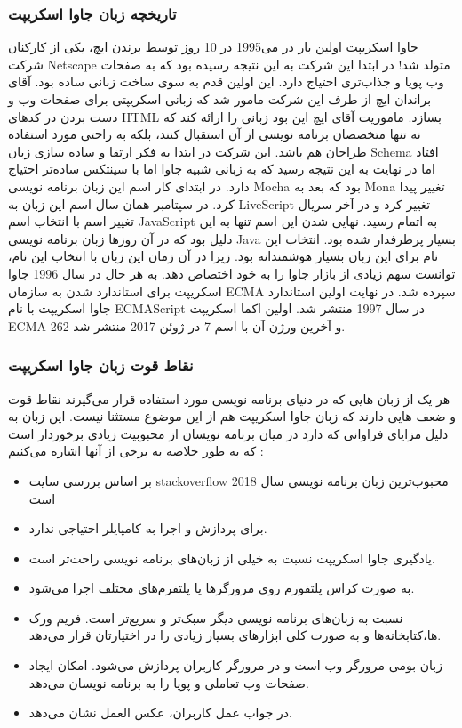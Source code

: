 \subsubsection{تاریخچه زبان جاوا اسکریپت}
جاوا اسکریپت اولین بار در می‌1995 در 10 روز توسط برندن ایچ، یکی از کارکنان شرکت Netscape متولد شد! در ابتدا این شرکت به این نتیجه رسیده بود که به صفحات وب پویا و جذاب‌تری احتیاج دارد. این اولین قدم به سوی ساخت زبانی ساده بود. آقای براندان ایچ از طرف این شرکت مامور شد که زبانی اسکریپتی برای صفحات وب و دست بردن در کدهای HTML بسازد. ماموریت آقای ایچ این بود زبانی را ارائه کند که نه تنها متخصصان برنامه نویسی از آن استقبال کنند، بلکه به راحتی مورد استفاده طراحان هم باشد.
این شرکت در ابتدا به فکر ارتقا و ساده سازی زبان Schema افتاد اما در نهایت به این نتیجه رسید که به زبانی شبیه جاوا اما با سینتکس ساده‌تر احتیاج دارد. در ابتدای کار اسم این زبان برنامه نویسی Mocha بود که بعد به Mona تغییر پیدا کرد. در سپتامبر همان سال اسم این زبان به LiveScript تغییر کرد و در آخر سریال تغییر اسم با انتخاب اسم JavaScript به اتمام  رسید.
نهایی شدن این اسم تنها به این دلیل بود که در آن روز‌ها زبان برنامه نویسی Java بسیار پرطرفدار شده بود. انتخاب این نام برای این زبان بسیار هوشمندانه بود. زیرا در آن زمان  این زبان با انتخاب این نام، توانست سهم زیادی از بازار جاوا را به خود اختصاص دهد. به هر حال در سال 1996 جاوا اسکریپت برای استاندارد شدن به سازمان ECMA سپرده شد. در نهایت اولین استاندارد جاوا اسکریپت با نام ECMAScript در سال 1997 منتشر شد. اولین اکما اسکریپت ECMA-262 و آخرین ورژن آن با اسم
7
در ژوئن 2017 منتشر شد.

\subsubsection{نقاط قوت زبان جاوا اسکریپت}
هر یک از زبان هایی که در دنیای برنامه نویسی مورد استفاده قرار می‌گیرند نقاط قوت و ضعف هایی دارند که زبان جاوا اسکریپت هم از این موضوع مستثنا نیست. این زبان به دلیل مزایای فراوانی که دارد در میان برنامه نویسان از محبوبیت زیادی برخوردار است که به طور خلاصه به برخی از آنها اشاره می‌کنیم :
\begin{itemize}
	\item
بر اساس بررسی سایت stackoverflow محبوب‌ترین زبان برنامه نویسی سال 2018 است
\item
برای پردازش و اجرا به کامپایلر احتیاجی ندارد.
\item
یادگیری جاوا اسکریپت نسبت به خیلی از زبان‌های برنامه نویسی راحت‌تر است.
\item
به صورت کراس پلتفورم روی مرورگر‌ها یا پلتفرم‌های مختلف اجرا می‌شود.
\item
نسبت به زبان‌های برنامه نویسی دیگر سبک‌تر و سریع‌تر است.
فریم ورک ها،کتابخانه‌ها و به صورت کلی ابزارهای بسیار زیادی را در اختیارتان قرار می‌دهد.
\item
زبان بومی مرورگر وب است و در مرورگر کاربران پردازش می‌شود.
امکان ایجاد صفحات وب تعاملی و پویا را به برنامه نویسان می‌دهد.
\item
در جواب عمل کاربران، عکس العمل نشان می‌دهد.

\end{itemize}

